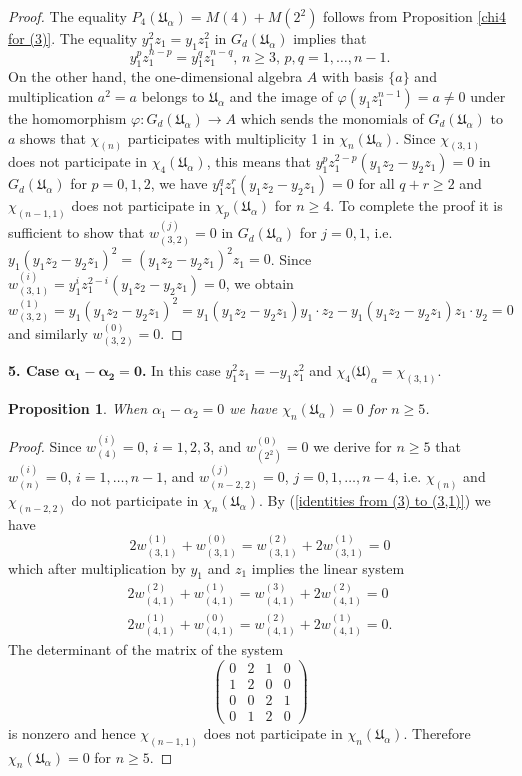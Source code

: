 \documentclass{amsart}
\newtheorem{proposition}[theorem]{Proposition}
\theoremstyle{definition}
\begin{document}
\begin{proof}
The equality $P_4({\mathfrak U}_{\alpha})=M(4)+M(2^2)$ follows from Proposition \ref{chi4 for (3)}.
The equality $y_1^2z_1=y_1z_1^2$ in $G_d({\mathfrak U}_{\alpha})$ implies that
\[
y_1^pz_1^{n-p}=y_1^qz_1^{n-q},\,n\geq 3,\,p,q=1,\ldots,n-1.
\]
On the other hand, the one-dimensional algebra $A$ with basis $\{a\}$ and multiplication $a^2=a$ belongs to ${\mathfrak U}_{\alpha}$ and
the image of $\varphi(y_1z_1^{n-1})=a\not=0$ under the homomorphism $\varphi:G_d({\mathfrak U}_{\alpha})\to A$ which sends the monomials of $G_d({\mathfrak U}_{\alpha})$ to $a$ shows that
$\chi_{(n)}$ participates with multiplicity 1 in $\chi_n({\mathfrak U}_{\alpha})$.
Since $\chi_{(3,1)}$ does not participate in $\chi_4({\mathfrak U}_{\alpha})$, this means that
$y_1^pz_1^{2-p}(y_1z_2-y_2z_1)=0$ in $G_d({\mathfrak U}_{\alpha})$ for $p=0,1,2$, we have $y_1^qz_1^r(y_1z_2-y_2z_1)=0$ for all $q+r\geq 2$
and $\chi_{(n-1,1)}$ does not participate in $\chi_p({\mathfrak U}_{\alpha})$ for $n\geq 4$. To complete the proof it is sufficient to show that
$w_{(3,2)}^{(j)}=0$ in $G_d({\mathfrak U}_{\alpha})$ for $j=0,1$, i.e. $y_1(y_1z_2-y_2z_1)^2=(y_1z_2-y_2z_1)^2z_1=0$.
Since $w_{(3,1)}^{(i)}=y_1^iz_1^{2-i}(y_1z_2-y_2z_1)=0$, we obtain
\[
w_{(3,2)}^{(1)}=y_1(y_1z_2-y_2z_1)^2=y_1(y_1z_2-y_2z_1)y_1\cdot z_2-y_1(y_1z_2-y_2z_1)z_1\cdot y_2=0
\]
and similarly $w_{(3,2)}^{(0)}=0$.
\end{proof}

{\bf 5. Case $\bm{\alpha_1-\alpha_2=0}$.} In this case $y_1^2z_1=-y_1z_1^2$ and
$\chi_4({\mathfrak U)}_{\alpha}=\chi_{(3,1)}$.

\begin{proposition}\label{chi for alpha1-alpha2=0}
When $\alpha_1-\alpha_2=0$ we have $\chi_n({\mathfrak U}_{\alpha})=0$ for $n\geq 5$.
\end{proposition}

\begin{proof}
Since $w_{(4)}^{(i)}=0$, $i=1,2,3$, and $w_{(2^2)}^{(0)}=0$ we derive for $n\geq 5$ that
$w_{(n)}^{(i)}=0$, $i=1,\ldots,n-1$, and $w_{(n-2,2)}^{(j)}=0$, $j=0,1,\ldots,n-4$, i.e.
$\chi_{(n)}$ and $\chi_{(n-2,2)}$ do not participate in $\chi_n({\mathfrak U}_{\alpha})$.
By (\ref{identities from (3) to (3,1)}) we have
\[
2w_{(3,1)}^{(1)}+w_{(3,1)}^{(0)}=w_{(3,1)}^{(2)}+2w_{(3,1)}^{(1)}=0
\]
which after multiplication by $y_1$ and $z_1$ implies the linear system
\[
\begin{split}
2w_{(4,1)}^{(2)}+w_{(4,1)}^{(1)}=w_{(4,1)}^{(3)}+2w_{(4,1)}^{(2)}=0\\
2w_{(4,1)}^{(1)}+w_{(4,1)}^{(0)}=w_{(4,1)}^{(2)}+2w_{(4,1)}^{(1)}=0.
\end{split}
\]
The determinant of the matrix of the system
\[
\left(
\begin{matrix}
0&2&1&0\\
1&2&0&0\\
0&0&2&1\\
0&1&2&0
\end{matrix}
\right)
\]
is nonzero and hence $\chi_{(n-1,1)}$ does not participate in $\chi_n({\mathfrak U}_{\alpha})$.
Therefore $\chi_n({\mathfrak U}_{\alpha})=0$ for $n\geq 5$.
\end{proof}
\end{document}
